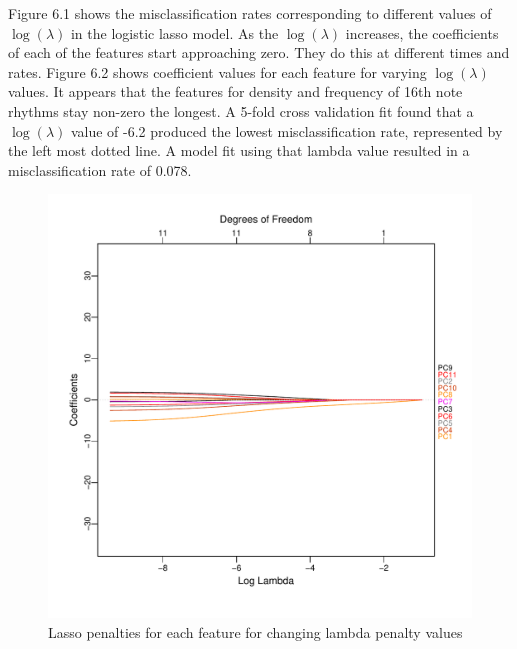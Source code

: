 \documentclass[12pt,twoside]{reedthesis}
\theoremstyle{definition}
\theoremstyle{definition}
\theoremstyle{definition}
\theoremstyle{remark}
\begin{document}
Figure 6.1 shows the misclassification rates corresponding to different
values of \(\log(\lambda)\) in the logistic lasso model. As the
\(\log(\lambda)\) increases, the coefficients of each of the features
start approaching zero. They do this at different times and rates.
Figure 6.2 shows coefficient values for each feature for varying
\(\log(\lambda)\) values. It appears that the features for density and
frequency of 16th note rhythms stay non-zero the longest. A 5-fold cross
validation fit found that a \(\log(\lambda)\) value of -6.2 produced the
lowest misclassification rate, represented by the left most dotted line.
A model fit using that lambda value resulted in a misclassification rate
of 0.078.
\begin{figure}[h]
\centering
\includegraphics[scale = .5]{images/lasso_coef_b.pdf}
\caption{Lasso penalties for each feature for changing lambda penalty values}
\label{subd}
\end{figure}
\end{document}

